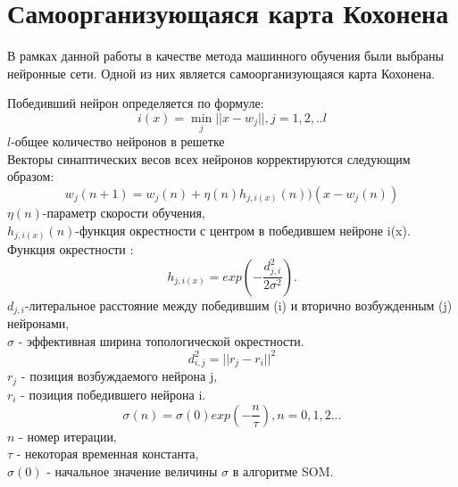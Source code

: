 \section {Самоорганизующаяся карта Кохонена}
В рамках данной работы в качестве метода машинного обучения были выбраны нейронные сети. Одной из них является самоорганизующаяся карта Кохонена.
\begin{figure}[H]
\end{figure}
Победивший нейрон определяется по формуле:
$$ i(x)=\min_j||x-w_j||, j=1,2,..l $$
$l$-\small общее количество нейронов в решетке 
\normalsize
\\
Векторы синаптических весов всех нейронов корректируются следующим образом:
$$w_j(n+1)=w_j(n)+\eta(n)h_{j,i(x)}(n))(x-w_j(n))$$
$\eta(n)$-\small параметр скорости обучения, \normalsize \\ 
$h_{j,i(x)}(n)$-\small функция окрестности с центром в победившем нейроне i(x). \normalsize \\ 
Функция окрестности :
$$ h_{j,i(x)}= exp(-\frac{d^2_{j,i}}{2\sigma^2}).$$
$d_{j,i}$-\small литеральное расстояние между победившим (i) и вторично возбужденным (j) нейронами, \normalsize \\ 
$\sigma$ - \small эффективная ширина топологической окрестности.  \\ 
\normalsize
$$d^2_{i,j}=||r_j-r_i||^2$$
$r_j$ - \small позиция возбуждаемого нейрона j, \\ \normalsize
$r_i$ - \small позиция победившего нейрона i. \\ \normalsize
$$ \sigma(n)=\sigma(0)exp(-\frac{n}{\tau}), n=0,1,2...$$ 
$n$ - \small номер итерации, \\ \normalsize
$\tau$ - \small некоторая временная константа, \\ \normalsize
$\sigma(0)$ - \small начальное значение величины \normalsize $\sigma$ \small в алгоритме SOM.\\ \normalsize

